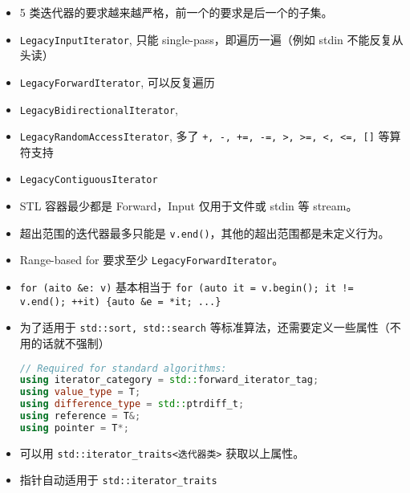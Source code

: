 
\begin{itemize}
\item 5 类迭代器的要求越来越严格，前一个的要求是后一个的子集。
\item \verb`LegacyInputIterator`, 只能 single-pass，即遍历一遍（例如 stdin 不能反复从头读）
\item \verb`LegacyForwardIterator`, 可以反复遍历
\item \verb`LegacyBidirectionalIterator`,
\item \verb`LegacyRandomAccessIterator`, 多了 \verb`+, -, +=, -=, >, >=, <, <=, []` 等算符支持
\item \verb`LegacyContiguousIterator`
\item STL 容器最少都是 Forward，Input 仅用于文件或 stdin 等 stream。
\item 超出范围的迭代器最多只能是 \verb`v.end()`，其他的超出范围都是未定义行为。
\item Range-based for 要求至少 \verb`LegacyForwardIterator`。
\item \verb`for (aito &e: v)` 基本相当于 \verb`for (auto it = v.begin(); it != v.end(); ++it) {auto &e = *it; ...}`
\item 为了适用于 \verb`std::sort, std::search` 等标准算法，还需要定义一些属性（不用的话就不强制）
\begin{lstlisting}[language=cpp]
// Required for standard algorithms:
using iterator_category = std::forward_iterator_tag;
using value_type = T;
using difference_type = std::ptrdiff_t;
using reference = T&;
using pointer = T*;
\end{lstlisting}
\item 可以用 \verb`std::iterator_traits<迭代器类>` 获取以上属性。
\item 指针自动适用于 \verb`std::iterator_traits`
\end{itemize}
